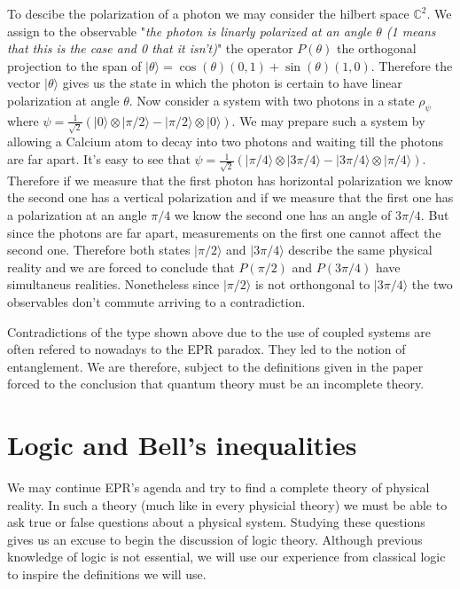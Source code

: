 \begin{example}
To descibe the polarization of a photon we may consider the hilbert space $\mathbb{C}^2$. We assign to the observable "\textit{the photon is linarly polarized at an angle $\theta$ (1 means that this is the case and 0 that it isn't)}" the operator $P(\theta)$ the orthogonal projection to the span of $|\theta\rangle=\cos(\theta)(0,1)+\sin(\theta)(1,0)$. Therefore the vector $|\theta\rangle$ gives us the state in which the photon is certain to have linear polarization at angle $\theta$. Now consider a system with two photons in a state $\rho_{\psi}$ where $\psi=\frac{1}{\sqrt{2}}\left(|0\rangle\otimes|\pi/2\rangle-|\pi/2\rangle\otimes|0\rangle\right)$. We may prepare such a system by allowing a Calcium atom to decay into two photons and waiting till the photons are far apart. It's easy to see that $\psi=\frac{1}{\sqrt{2}}\left(|\pi/4\rangle\otimes|3\pi/4\rangle-|3\pi/4\rangle\otimes|\pi/4\rangle\right)$. Therefore if we measure that the first photon has horizontal polarization we know the second one has a vertical polarization and if we measure that the first one has a polarization at an angle $\pi/4$ we know the second one has an angle of $3\pi/4$. But since the photons are far apart, measurements on the first one cannot affect the second one. Therefore both states $|\pi/2\rangle$ and $|3\pi/4\rangle$ describe the same physical reality and we are forced to conclude that $P(\pi/2)$ and $P(3\pi/4)$ have simultaneus realities. Nonetheless since $|\pi/2\rangle$ is not orthongonal to $|3\pi/4\rangle$ the two observables don't commute arriving to a contradiction. 
\end{example}

Contradictions of the type shown above due to the use of coupled systems are often refered to nowadays to the EPR paradox. They led to the notion of entanglement. We are therefore, subject to the definitions given in the paper \cite{Einstein1935} forced to the conclusion that quantum theory must be an incomplete theory.  

\section{Logic and Bell's inequalities}

We may continue EPR's agenda and try to find a complete theory of physical reality. In such a theory (much like in every physicial theory) we must be able to ask true or false questions about a physical system. Studying these questions gives us an excuse to begin the discussion of logic theory. Although previous knowledge of logic is not essential, we will use our experience from classical logic to inspire the definitions we will use.

